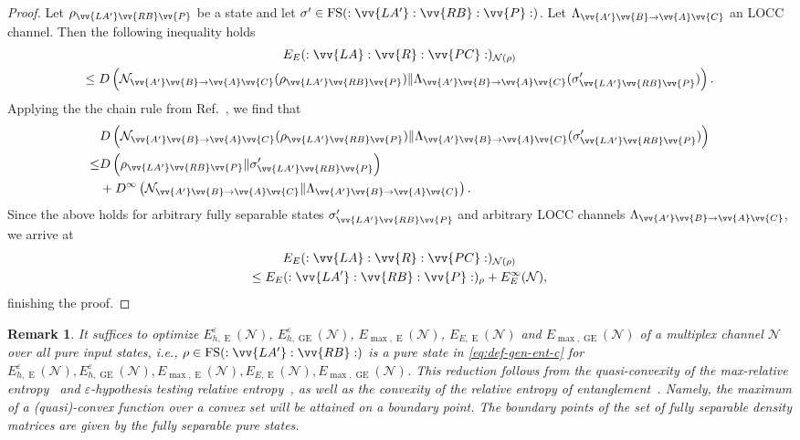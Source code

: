 \documentclass[aps,pra,twocolumn,superscriptaddress,longbibliography]{revtex4-1}
\def\FS{\operatorname{FS}}
\def\GE{\operatorname{GE}}
\def\E{\operatorname{E}}
\def\({\left(}
\def\){\right)}
\newcommand{\mc}[1]{\mathcal{#1}}
\newtheorem{remark}{Remark}
\begin{document}
\begin{proof}
Let $\rho_{\vv{LA'}\vv{RB}\vv{P}}$ be a state and let $\sigma'\in\FS(:\vv{LA'}:\vv{RB}:\vv{P}:)$. Let $\Lambda_{\vv{A'}\vv{B}\to\vv{A}\vv{C}}$ an LOCC channel. Then the following inequality holds
\begin{multline}
E_{E}(:\vv{LA}:\vv{R}:\vv{PC}:)_{\mc{N}(\rho)}\\ 
 \leq D\(\mc{N}_{\vv{A'}\vv{B}\to\vv{A}\vv{C}}(\rho_{\vv{LA'}\vv{RB}\vv{P}})\Vert \Lambda_{\vv{A'}\vv{B}\to\vv{A}\vv{C}}(\sigma'_{\vv{LA'}\vv{RB}\vv{P}}) \).
 \end{multline}
Applying the the chain rule from Ref.~\cite{fang2019chain}, we find that
\begin{align*}
&D\(\mc{N}_{\vv{A'}\vv{B}\to\vv{A}\vv{C}}(\rho_{\vv{LA'}\vv{RB}\vv{P}})\Vert \Lambda_{\vv{A'}\vv{B}\to\vv{A}\vv{C}}(\sigma'_{\vv{LA'}\vv{RB}\vv{P}}) \)\\
\leq&D\(\rho_{\vv{LA'}\vv{RB}\vv{P}}\Vert \sigma'_{\vv{LA'}\vv{RB}\vv{P}} \)\\ 
& +D^{\infty}\(\mc{N}_{\vv{A'}\vv{B}\to\vv{A}\vv{C}}\Vert \Lambda_{\vv{A'}\vv{B}\to\vv{A}\vv{C}}\).
\end{align*}
Since the above holds for arbitrary fully separable states $\sigma'_{\vv{LA'}\vv{RB}\vv{P}}$ and arbitrary LOCC channels $\Lambda_{\vv{A'}\vv{B}\to\vv{A}\vv{C}}$, we arrive at
\begin{multline}
E_{E}(:\vv{LA}:\vv{R}:\vv{PC}:)_{\mc{N}(\rho)}\\
 \leq  E_{E}(:\vv{LA'}:\vv{RB}:\vv{P}:)_{\rho}+ E^\infty_{E}(\mc{N}),
\end{multline}
finishing the proof.
\end{proof}


\begin{remark}
It suffices to optimize $E^\varepsilon_{h,\E}(\mc{N})$, $E^\varepsilon_{h,\GE}(\mc{N})$, $E_{\max,\E}(\mc{N})$, $E_{E,\E}(\mc{N})$ and $E_{\max,\GE}(\mc{N})$ of a multiplex channel $\mc{N}$ over all pure input states, i.e., $\rho\in\FS(:\vv{LA'}:\vv{RB}:)$ is a pure state in \eqref{eq:def-gen-ent-c} for $E^\varepsilon_{h,\E}(\mc{N}),E^\varepsilon_{h,\GE}(\mc{N}), E_{\max,\E}(\mc{N}), E_{E,\E}(\mc{N}), E_{\max,\GE}(\mc{N})$. This reduction follows from the quasi-convexity of the max-relative entropy~\cite{D09} and $\varepsilon$-hypothesis testing relative entropy~\cite{TT13}, as well as the convexity of the relative entropy of entanglement~\cite{VP98}. Namely, the maximum of a (quasi)-convex function over a convex set will be attained on a boundary point. The boundary points of the set of fully separable density matrices are given by the fully separable pure states. 
\end{remark}
\end{document}
